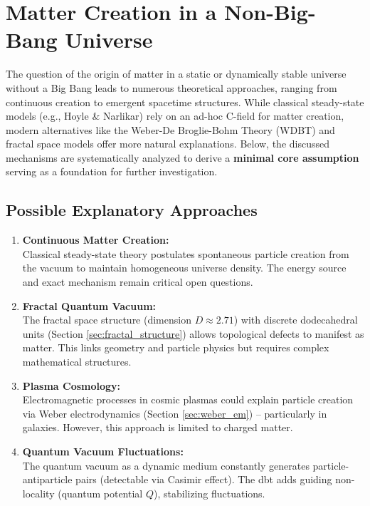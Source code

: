 \section{Matter Creation in a Non-Big-Bang Universe}  
The question of the origin of matter in a static or dynamically stable universe without a Big Bang leads to numerous theoretical approaches, ranging from continuous creation  
to emergent spacetime structures. While classical steady-state models (e.g., Hoyle \& Narlikar) rely on an ad-hoc C-field for matter creation, modern  
alternatives like the Weber-De Broglie-Bohm Theory (WDBT) and fractal space models offer more natural explanations. Below, the discussed mechanisms are systematically analyzed to derive a  
\textbf{minimal core assumption} serving as a foundation for further investigation.  

\subsection{Possible Explanatory Approaches}  
\begin{enumerate}  
    \item \textbf{Continuous Matter Creation:}\\Classical steady-state theory postulates spontaneous particle creation from the vacuum to maintain homogeneous universe density. The energy source and exact mechanism remain critical open questions.  
    \item \textbf{Fractal Quantum Vacuum:}\\The fractal space structure (dimension $D \approx 2.71$) with discrete dodecahedral units (Section \ref{sec:fractal_structure}) allows topological defects to manifest as matter. This links geometry and particle physics but requires complex mathematical structures.  
    \item \textbf{Plasma Cosmology:}\\Electromagnetic processes in cosmic plasmas could explain particle creation via Weber electrodynamics (Section \ref{sec:weber_em}) – particularly in galaxies. However, this approach is limited to charged matter.  
    \item \textbf{Quantum Vacuum Fluctuations:}\\The quantum vacuum as a dynamic medium constantly generates particle-antiparticle pairs (detectable via Casimir effect). The \gls{dbt} adds guiding non-locality (quantum potential $Q$), stabilizing fluctuations.  
\end{enumerate}

